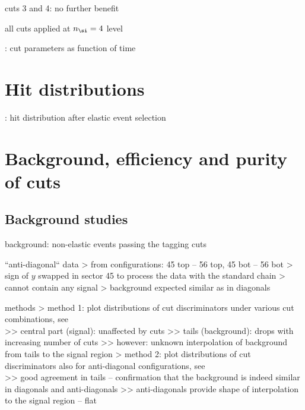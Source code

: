 \> cuts 3 and 4: no further benefit

\> all cuts applied at $n_\si = 4$ level

\>  : cut parameters as function of time



\section{Hit distributions}

\> : hit distribution after elastic event selection



\section{Background, efficiency and purity of cuts}

\subsection{Background studies}

\> background: non-elastic events passing the tagging cuts

\> ``anti-diagonal`` data
\>> from configurations: 45 top -- 56 top, 45 bot -- 56 bot
\>> sign of $y$ swapped in sector 45 to process the data with the standard chain
\>> cannot contain any signal
\>> background expected similar as in diagonals

\> methods
\>> method 1: plot distributions of cut discriminators under various cut combinations, see\\ 
\>>> central part (signal): unaffected by cuts
\>>> tails (background): drops with increasing number of cuts
\>>> however: unknown interpolation of background from tails to the signal region
\>> method 2: plot distributions of cut discriminators also for anti-diagonal configurations, see\\ 
\>>> good agreement in tails -- confirmation that the background is indeed similar in diagonals and anti-diagonals
\>>> anti-diagonals provide shape of interpolation to the signal region -- flat

